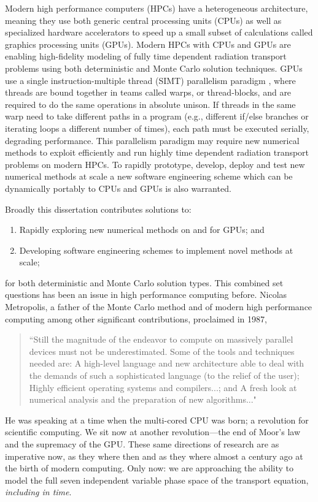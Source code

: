Modern high performance computers (HPCs) have a heterogeneous architecture, meaning they use both generic central processing units (CPUs) as well as specialized hardware accelerators to speed up a small subset of calculations called graphics processing units (GPUs).
Modern HPCs with CPUs and GPUs are enabling high-fidelity modeling of fully time dependent radiation transport problems using both deterministic and Monte Carlo solution techniques.
GPUs use a single instruction-multiple thread (SIMT) parallelism paradigm \cite{cuda}, where threads are bound together in teams called warps, or thread-blocks, and are required to do the same operations in absolute unison. 
If threads in the same warp need to take different paths in a program (e.g., different if/else branches or iterating loops a different number of times), each path must be executed serially, degrading performance.
This parallelism paradigm may require new numerical methods to exploit efficiently and run highly time dependent radiation transport problems on modern HPCs.
To rapidly prototype, develop, deploy and test new numerical methods at scale a new software engineering scheme which can be dynamically portably to CPUs and GPUs is also warranted.

Broadly this dissertation contributes solutions to:
\begin{enumerate}
    \item Rapidly exploring new numerical methods on and for GPUs; and
    \item Developing software engineering schemes to implement novel methods at scale;
\end{enumerate}
for both deterministic and Monte Carlo solution types.
This combined set questions has been an issue in high performance computing before.
Nicolas Metropolis, a father of the Monte Carlo method and of modern high performance computing among other significant contributions, proclaimed in 1987,
\blockquote[\cite{metropolis_1987_history}][]{
``Still the magnitude of the endeavor to compute on massively parallel devices must not be underestimated. Some of the tools and techniques needed are: A high-level language and new architecture able to deal with the demands of such a sophisticated language (to the relief of the user); Highly efficient operating systems and compilers...; and A fresh look at numerical analysis and the preparation of new algorithms..."
}
He was speaking at a time when the multi-cored CPU was born; a revolution for scientific computing.
We sit now at another revolution---the end of Moor's law and the supremacy of the GPU.
These same directions of research are as imperative now, as they where then and as they where almost a century ago at the birth of modern computing. 
Only now: we are approaching the ability to model the full seven independent variable phase space of the transport equation, \emph{including in time}.

